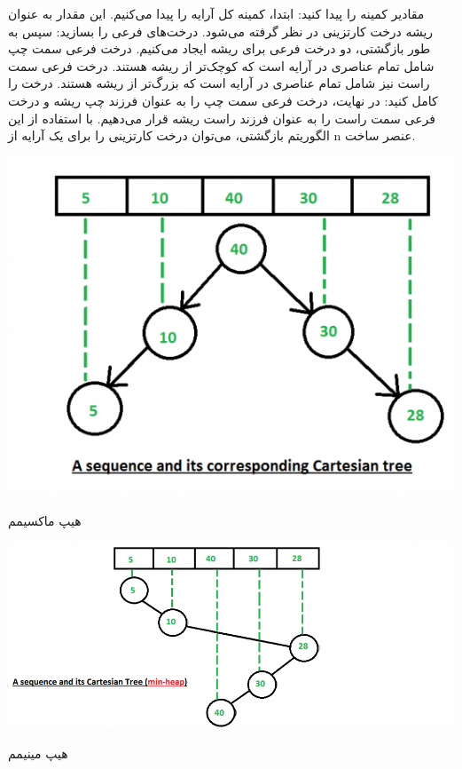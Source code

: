 \documentclass{article}
\begin{document}
\newline مقادیر کمینه را پیدا کنید: ابتدا، کمینه کل آرایه را پیدا می‌کنیم. این مقدار به عنوان ریشه درخت کارتزینی در نظر گرفته می‌شود.
\newline درخت‌های فرعی را بسازید: سپس به طور بازگشتی، دو درخت فرعی برای ریشه ایجاد می‌کنیم. درخت فرعی سمت چپ شامل تمام عناصری در آرایه است که کوچک‌تر از ریشه هستند. درخت فرعی سمت راست نیز شامل تمام عناصری در آرایه است که بزرگ‌تر از ریشه هستند.
\newline درخت را کامل کنید: در نهایت، درخت فرعی سمت چپ را به عنوان فرزند چپ ریشه و درخت فرعی سمت راست را به عنوان فرزند راست ریشه قرار می‌دهیم.
\newline با استفاده از این الگوریتم بازگشتی، می‌توان درخت کارتزینی را برای یک آرایه از n عنصر ساخت.
\begin{center}
    \includegraphics[scale=0.3]{second.png}
\end{center}
\begin{center}
    \small هیپ ماکسیمم
\end{center}
\begin{center}
    \includegraphics[scale=0.3]{third.png}
\end{center}
\begin{center}
    \small هیپ مینیمم
\end{center}
\end{document}
